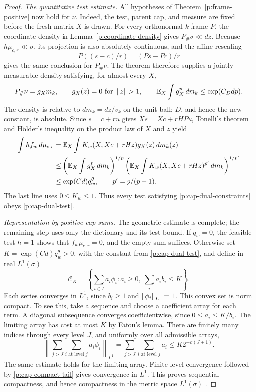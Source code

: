 \begin{proof}
\smallskip\noindent
\emph{The quantitative test estimate.}
All hypotheses of Theorem~\ref{p:frame-positive} now hold for $\nu$.
Indeed, the test, parent cap, and measure are fixed before the fresh
matrix $X$ is drawn. For every orthonormal $k$-frame $P$, the coordinate
density in Lemma~\ref{p:coordinate-density} gives $P_\#\sigma\ll dz$.
Because $h\mu_{c,r}\ll\sigma$, its projection is also absolutely
continuous, and the affine rescaling
\[
 P((s-c)/r)=(Ps-Pc)/r
\]
gives the same conclusion for $P_\#\nu$. The theorem therefore supplies
a jointly measurable density satisfying, for almost every $X$,
\[
 P_\#\nu=g_Xm_k,\qquad g_X(z)=0\text{ for }\left\lVert z\right\rVert>1,
 \qquad \mathbb E_X\int g_X^p\,dm_k\le\exp(C_Ddp).
\]
The density is relative to $dm_k=dz/v_k$ on the unit ball; $D$, and
hence the new constant, is absolute. Since $s=c+ru$ gives
$Xs=Xc+rHPu$, Tonelli's theorem and H\"older's inequality on the product
law of $X$ and $z$ yield
\begin{equation}\label{p:cap-dual-test}
\begin{split}
 \int h f_w\,d\mu_{c,r}
 &=\mathbb E_X\int K_w(X,Xc+rHz)g_X(z)\,dm_k(z)\\
 &\le\left(\mathbb E_X\int g_X^p\,dm_k\right)^{1/p}
 \left(\mathbb E_X\int K_w(X,Xc+rHz)^{p'}\,dm_k\right)^{1/p'}\\
 &\le\exp(Cd)q_w^\theta,\qquad p'=p/(p-1).
\end{split}
\end{equation}
The last line uses $0\le K_w\le1$. Thus every test satisfying
\eqref{p:cap-dual-constraints} obeys \eqref{p:cap-dual-test}.

\smallskip\noindent
\emph{Representation by positive cap sums.}
The geometric estimate is complete; the remaining step uses only the
dictionary and its test bound. If $q_w=0$, the feasible test $h=1$ shows
that $f_w\mu_{c,r}=0$, and the empty sum suffices. Otherwise set
$K=\exp(Cd)q_w^\theta>0$, with the constant from
\eqref{p:cap-dual-test}, and define in real $L^1(\sigma)$
\[
 \mathcal C_K=\left\{\sum_{i\in I}a_i\phi_i:
 a_i\ge0,\ \sum_i a_ib_i\le K\right\}.
\]
Each series converges in $L^1$, since $b_i\ge1$ and
$\left\lVert \phi_i\right\rVert_{L^1}=1$. This convex set is norm compact. To see this,
take a sequence and choose a coefficient array for each term. A diagonal
subsequence converges coefficientwise, since $0\le a_i\le K/b_i$.
The limiting array has cost at most $K$ by Fatou's lemma. There are
finitely many indices through every level $J$, and uniformly over all
admissible arrays,
\begin{equation}\label{p:cap-compact-tail}
 \left\|\sum_{j>J}\sum_{i\text{ at level }j}a_i\phi_i\right\|_{L^1}
 =\sum_{j>J}\sum_{i\text{ at level }j}a_i
 \le K2^{-\alpha(J+1)}.
\end{equation}
The same estimate holds for the limiting array. Finite-level convergence
followed by \eqref{p:cap-compact-tail} gives convergence in $L^1$.
This proves sequential compactness, and hence compactness in the metric
space $L^1(\sigma)$
\cite[Section~1.3, Theorem~1.37, p.~29]{SchnaubeltFA2025}.


\end{proof}
